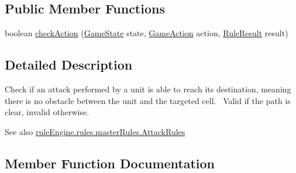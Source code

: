 \subsection*{Public Member Functions}
\begin{DoxyCompactItemize}
\item 
boolean \mbox{\hyperlink{classrule_engine_1_1rules_1_1atomic_rules_1_1_check_is_empty_attack_path_a60ed32ecc147e0e79ce7800e2769e9da}{check\+Action}} (\mbox{\hyperlink{classgame_1_1game_state_1_1_game_state}{Game\+State}} state, \mbox{\hyperlink{classrule_engine_1_1_game_action}{Game\+Action}} action, \mbox{\hyperlink{classrule_engine_1_1_rule_result}{Rule\+Result}} result)
\end{DoxyCompactItemize}


\subsection{Detailed Description}
Check if an attack performed by a unit is able to reach its destination, meaning there is no obstacle between the unit and the targeted cell.~\newline
 Valid if the path is clear, invalid otherwise.

\begin{DoxySeeAlso}{See also}
\mbox{\hyperlink{classrule_engine_1_1rules_1_1master_rules_1_1_attack_rules}{rule\+Engine.\+rules.\+master\+Rules.\+Attack\+Rules}} 
\end{DoxySeeAlso}


\subsection{Member Function Documentation}
\mbox{\label{classrule_engine_1_1rules_1_1atomic_rules_1_1_check_is_empty_attack_path_a60ed32ecc147e0e79ce7800e2769e9da}} 
